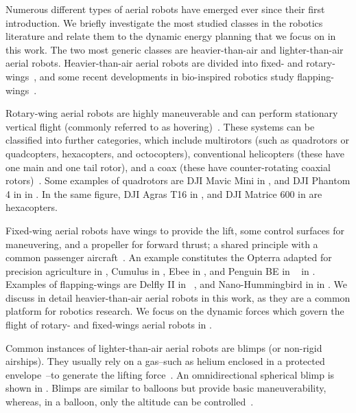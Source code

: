 Numerous different types of aerial robots have emerged ever since their first introduction. We briefly investigate the most studied classes in the robotics literature and relate them to the dynamic energy planning that we focus on in this work. The two most generic classes are heavier-than-air and lighter-than-air aerial robots. Heavier-than-air aerial robots are divided into fixed- and rotary-wings~\citep{siciliano2016springer}, and some recent developments in bio-inspired robotics study flapping-wings~\citep{floreano2015science}. 

Rotary-wing aerial robots are highly maneuverable and can perform stationary vertical flight (commonly referred to as hovering)~\citep{siciliano2016springer}. These systems can be classified into further categories, which include multirotors (such as quadrotors or quadcopters, hexacopters, and octocopters), conventional helicopters (these have one main and one tail rotor), and a coax (these have counter-rotating coaxial rotors)~\citep{corke2017robotics}. Some examples of quadrotors are DJI Mavic Mini in , and DJI Phantom 4 in  in . In the same figure, DJI Agras T16 in , and DJI Matrice 600 in  are hexacopters.

Fixed-wing aerial robots have wings to provide the lift, some control surfaces for maneuvering, and a propeller for forward thrust; a shared principle with a common passenger aircraft~\citep{corke2017robotics}. An example constitutes the Opterra adapted for precision agriculture in , Cumulus in , Ebee in , and Penguin BE in ~\citep{haugen2016monitoring} in . Examples of flapping-wings are Delfly II in ~\citep{percin2012flow}, and Nano-Hummingbird in  in . We discuss in detail heavier-than-air aerial robots in this work, as they are a common platform for robotics research. We focus on the dynamic forces which govern the flight of rotary- and fixed-wings aerial robots in .

Common instances of lighter-than-air aerial robots are blimps (or non-rigid airships). They usually rely on a gas--such as helium enclosed in a protected envelope~\citep{burri2013design}--to generate the lifting force~\citep{fui2017recent}. An omnidirectional spherical blimp is shown in . Blimps are similar to balloons but provide basic maneuverability, whereas, in a balloon, only the altitude can be controlled~\citep{colombatti2011lighter}.

